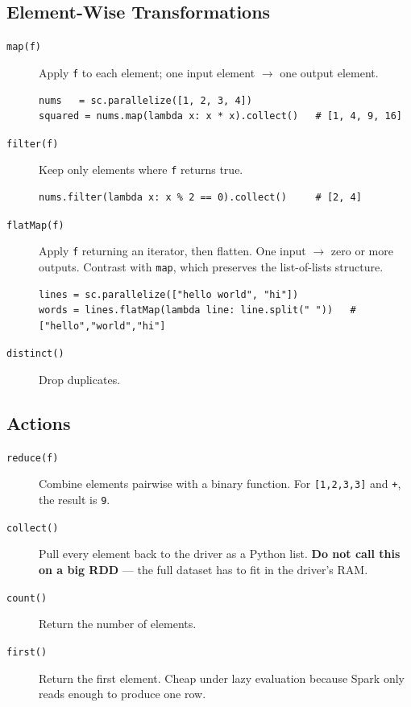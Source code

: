 \documentclass[11pt]{article}
\begin{document}
\subsection{Element-Wise Transformations}
\begin{description}
    \item[\texttt{map(f)}] Apply \texttt{f} to each element; one input element $\to$ one output element.
    \begin{verbatim}
nums   = sc.parallelize([1, 2, 3, 4])
squared = nums.map(lambda x: x * x).collect()   # [1, 4, 9, 16]
    \end{verbatim}

    \item[\texttt{filter(f)}] Keep only elements where \texttt{f} returns true.
    \begin{verbatim}
nums.filter(lambda x: x % 2 == 0).collect()     # [2, 4]
    \end{verbatim}

    \item[\texttt{flatMap(f)}] Apply \texttt{f} returning an iterator, then flatten. One input $\to$ zero or more outputs. Contrast with \texttt{map}, which preserves the list-of-lists structure.
    \begin{verbatim}
lines = sc.parallelize(["hello world", "hi"])
words = lines.flatMap(lambda line: line.split(" "))   # ["hello","world","hi"]
    \end{verbatim}

    \item[\texttt{distinct()}] Drop duplicates.
\end{description}

\subsection{Actions}
\begin{description}
    \item[\texttt{reduce(f)}] Combine elements pairwise with a binary function. For \texttt{[1,2,3,3]} and \texttt{+}, the result is \texttt{9}.
    \item[\texttt{collect()}] Pull every element back to the driver as a Python list. \textbf{Do not call this on a big RDD} --- the full dataset has to fit in the driver's RAM.
    \item[\texttt{count()}] Return the number of elements.
    \item[\texttt{first()}] Return the first element. Cheap under lazy evaluation because Spark only reads enough to produce one row.
\end{description}
\end{document}
